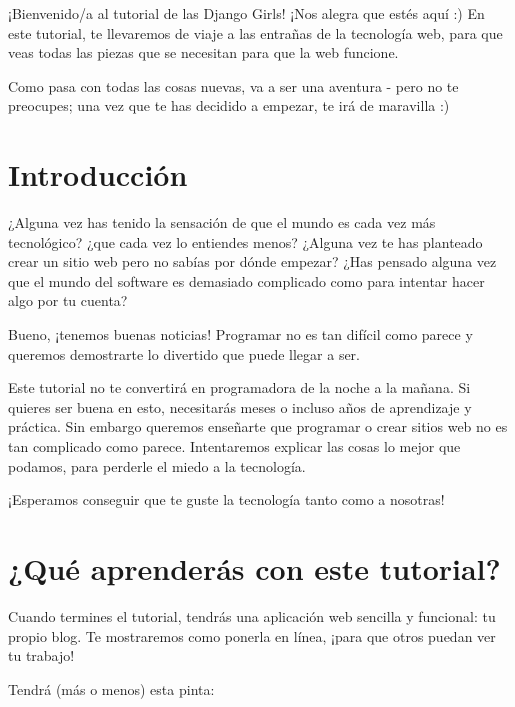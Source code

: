 \documentclass[
  a4paper,
  DIV=11,
  numbers=noendperiod,
  onepage,
  openany]{scrreprt}
\begin{document}
¡Bienvenido/a al tutorial de las Django Girls! ¡Nos alegra que estés
aquí :) En este tutorial, te llevaremos de viaje a las entrañas de la
tecnología web, para que veas todas las piezas que se necesitan para que
la web funcione.

Como pasa con todas las cosas nuevas, va a ser una aventura - pero no te
preocupes; una vez que te has decidido a empezar, te irá de maravilla :)

\chapter{Introducción}\label{introducciuxf3n-1}

¿Alguna vez has tenido la sensación de que el mundo es cada vez más
tecnológico? ¿que cada vez lo entiendes menos? ¿Alguna vez te has
planteado crear un sitio web pero no sabías por dónde empezar? ¿Has
pensado alguna vez que el mundo del software es demasiado complicado
como para intentar hacer algo por tu cuenta?

Bueno, ¡tenemos buenas noticias! Programar no es tan difícil como parece
y queremos demostrarte lo divertido que puede llegar a ser.

Este tutorial no te convertirá en programadora de la noche a la mañana.
Si quieres ser buena en esto, necesitarás meses o incluso años de
aprendizaje y práctica. Sin embargo queremos enseñarte que programar o
crear sitios web no es tan complicado como parece. Intentaremos explicar
las cosas lo mejor que podamos, para perderle el miedo a la tecnología.

¡Esperamos conseguir que te guste la tecnología tanto como a nosotras!

\chapter{¿Qué aprenderás con este
tutorial?}\label{quuxe9-aprenderuxe1s-con-este-tutorial}

Cuando termines el tutorial, tendrás una aplicación web sencilla y
funcional: tu propio blog. Te mostraremos como ponerla en línea, ¡para
que otros puedan ver tu trabajo!

Tendrá (más o menos) esta pinta:
\end{document}
